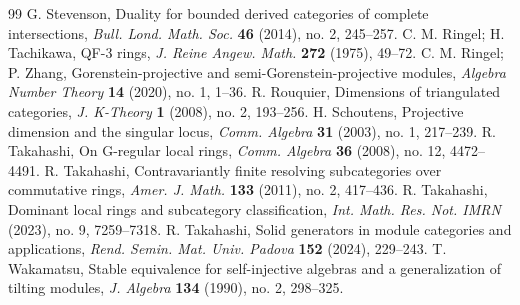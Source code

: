 \documentclass{amsart}
\theoremstyle{definition}
\theoremstyle{remark}
\numberwithin{equation}{thm}
\begin{document}
\begin{thebibliography}{99}
{\sc G. Stevenson}, Duality for bounded derived categories of complete intersections, {\it Bull. Lond. Math. Soc.} {\bf 46} (2014), no. 2, 245--257.
{\sc C. M. Ringel; H. Tachikawa}, QF-3 rings, {\it J. Reine Angew. Math.} {\bf 272} (1975), 49--72.
{\sc C. M. Ringel; P. Zhang}, Gorenstein-projective and semi-Gorenstein-projective modules, {\it Algebra Number Theory} {\bf 14} (2020), no. 1, 1--36.
{\sc R. Rouquier}, Dimensions of triangulated categories, {\it J. K-Theory} {\bf 1} (2008), no. 2, 193--256.
{\sc H. Schoutens}, Projective dimension and the singular locus, {\it Comm. Algebra} {\bf 31} (2003), no. 1, 217--239.
{\sc R. Takahashi}, On G-regular local rings, {\it Comm. Algebra} {\bf 36} (2008), no. 12, 4472--4491.
{\sc R. Takahashi}, Contravariantly finite resolving subcategories over commutative rings, {\it Amer. J. Math.} {\bf 133} (2011), no. 2, 417--436.
{\sc R. Takahashi}, Dominant local rings and subcategory classification, {\it Int. Math. Res. Not. IMRN} (2023), no. 9, 7259--7318.
{\sc R. Takahashi}, Solid generators in module categories and applications, {\em Rend. Semin. Mat. Univ. Padova} {\bf 152} (2024), 229--243.
{\sc T. Wakamatsu}, Stable equivalence for self-injective algebras and a generalization of tilting modules, {\it J. Algebra} {\bf 134} (1990), no. 2, 298--325.
\end{thebibliography}
\end{document}
